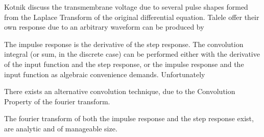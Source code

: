 \documentclass[fleqn,10pt]{paper}
\begin{document}
Kotnik discuss the transmembrane voltage due to several pulse shapes formed from the Laplace Transform of the original differential equation. Talele offer their own response due to an arbitrary waveform can be produced by 

The impulse response is the derivative of the step response. The convolution integral (or sum, in the discrete case) can be performed either with the derivative of the input function and the step response, or the impulse response and the input function as algebraic convenience demands. Unfortunately

There exists an alternative convolution technique, due to the Convolution Property of the fourier transform.

The fourier transform of both the impulse response and the step response exist, are analytic and of manageable size.








\end{document}
